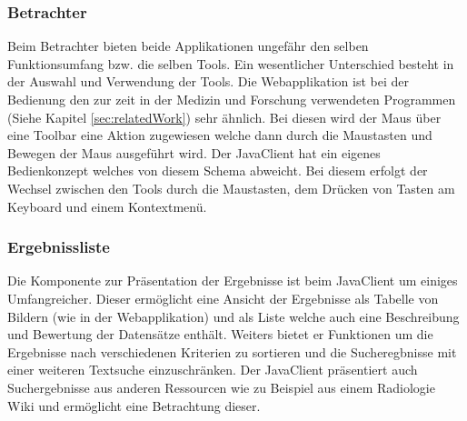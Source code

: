 \subsubsection{Betrachter}
\label{sec:ua_Betrachter}
Beim Betrachter bieten beide Applikationen ungefähr den selben Funktionsumfang bzw. die selben Tools.
Ein wesentlicher Unterschied besteht in der Auswahl und Verwendung der Tools.
Die Webapplikation ist bei der Bedienung den zur zeit in der Medizin und Forschung verwendeten Programmen (Siehe Kapitel \ref{sec:relatedWork}) sehr ähnlich.
Bei diesen wird der Maus über eine Toolbar eine Aktion zugewiesen welche dann durch die Maustasten und Bewegen der Maus ausgeführt wird.
Der JavaClient hat ein eigenes Bedienkonzept welches von diesem Schema abweicht.
Bei diesem erfolgt der Wechsel zwischen den Tools durch die Maustasten, dem Drücken von Tasten am Keyboard und einem Kontextmenü.

\subsubsection{Ergebnissliste}
\label{sec:ua_Ergebnissliste}
Die Komponente zur Präsentation der Ergebnisse ist beim JavaClient um einiges Umfangreicher.
Dieser ermöglicht eine Ansicht der Ergebnisse als Tabelle von Bildern (wie in der Webapplikation) und als Liste welche auch eine Beschreibung und Bewertung der Datensätze enthält.
Weiters bietet er Funktionen um die Ergebnisse nach verschiedenen Kriterien zu sortieren und die Sucheregbnisse mit einer weiteren Textsuche einzuschränken.
Der JavaClient präsentiert auch Suchergebnisse aus anderen Ressourcen wie zu Beispiel aus einem Radiologie Wiki und ermöglicht eine Betrachtung dieser.

